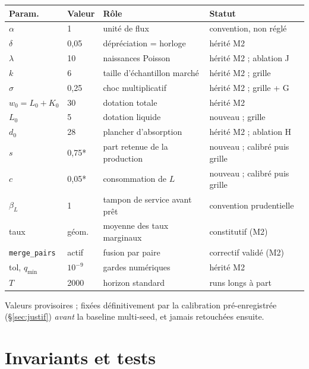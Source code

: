 \documentclass[11pt,a4paper]{article}
\newcommand{\code}[1]{\texttt{#1}}
\begin{document}
\begin{center}
\begin{tabular}{llll}
\toprule
Param. & Valeur & Rôle & Statut \\
\midrule
$\alpha$ & 1 & unité de flux & convention, non réglé \\
$\delta$ & 0,05 & dépréciation = horloge & hérité M2 \\
$\lambda$ & 10 & naissances Poisson & hérité M2 ; ablation J \\
$k$ & 6 & taille d'échantillon marché & hérité M2 ; grille \\
$\sigma$ & 0,25 & choc multiplicatif & hérité M2 ; grille + G \\
$w_0 = L_0 + K_0$ & 30 & dotation totale & hérité M2 \\
$L_0$ & 5 & dotation liquide & nouveau ; grille \\
$d_0$ & 28 & plancher d'absorption & hérité M2 ; ablation H \\
$s$ & 0,75* & part retenue de la production & nouveau ; calibré puis grille \\
$c$ & 0,05* & consommation de $L$ & nouveau ; calibré puis grille \\
$\beta_L$ & 1 & tampon de service avant prêt & convention prudentielle \\
taux & géom. & moyenne des taux marginaux & constitutif (M2) \\
\code{merge\_pairs} & actif & fusion par paire & correctif validé (M2) \\
tol, $q_{\min}$ & $10^{-9}$ & gardes numériques & hérité M2 \\
$T$ & 2000 & horizon standard & runs longs à part \\
\bottomrule
\end{tabular}
\end{center}
\noindent *Valeurs provisoires ; fixées définitivement par la calibration
pré-enregistrée (§\ref{sec:justif}) \emph{avant} la baseline multi-seed, et
jamais retouchées ensuite.

\section{Invariants et tests}
\end{document}
